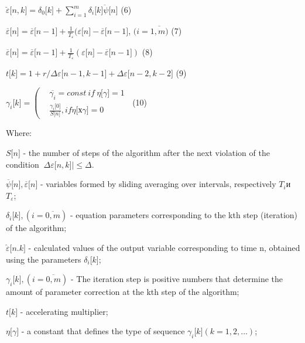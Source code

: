 \(\breve{\varepsilon}\lbrack n,k\rbrack = \delta_{0}\lbrack k\rbrack + \sum_{i = 1}^{m}{\delta_{i}\lbrack k\overline{\rbrack\psi}\lbrack n\rbrack}\)
(6)

\(\overline{\varepsilon}\lbrack n\rbrack = \overline{\varepsilon}\lbrack n - 1\rbrack + \frac{1}{T_{\varepsilon}}(\varepsilon\lbrack n\rbrack - \overline{\varepsilon}\lbrack n - 1\rbrack\),
\((i = \overline{1,m)}\) (7)

\(\overline{\varepsilon}\lbrack n\rbrack = \overline{\varepsilon}\lbrack n - 1\rbrack + \frac{1}{T_{\varepsilon}}(\varepsilon\lbrack n\rbrack - \overline{\varepsilon}\lbrack n - 1\rbrack)\)
(8)

\(t\lbrack k\rbrack = 1 + r/\Delta\varepsilon\lbrack n - 1,k - 1\rbrack + \Delta\varepsilon\lbrack n - 2,k - 2\rbrack\)
(9)

\(\gamma_{i}\lbrack k\rbrack = \left( \begin{aligned}
 & \overline{\gamma_{i}} = const\ if\ \eta\lbrack\gamma\rbrack = 1 \\
 & \frac{\gamma_{i}\lbrack 0\rbrack}{S\lbrack n\rbrack},if\eta\lbrack х\gamma\rbrack = 0
\end{aligned} \right.\ \) (10)

Where:

\(S\lbrack n\rbrack\) - the number of steps of the algorithm after the
next violation of the condition
\(\left. \ \Delta\varepsilon\lbrack n,k\rbrack \right| \leq \Delta\).

\(\overline{\psi}\lbrack n\rbrack,\overline{\varepsilon}\lbrack n\rbrack\)
- variables formed by sliding averaging over intervals, respectively
\(T_{i}\)и \(T_{\varepsilon}\);

\(\delta_{i}\lbrack k\rbrack,(i = \overline{0,m})\) - equation
parameters corresponding to the kth step (iteration) of the algorithm;

\(\overset{̑}{\varepsilon}\lbrack n.k\rbrack\) - calculated values of the
output variable corresponding to time n, obtained using the parameters
\(\delta_{i}\lbrack k\rbrack\);

\(\gamma_{i}\lbrack k\rbrack,(i = \overline{0,m})\) - The iteration step
is positive numbers that determine the amount of parameter correction at
the kth step of the algorithm;

\(t\lbrack k\rbrack\) - accelerating multiplier;

\(\eta\lbrack\gamma\rbrack\) - a constant that defines the type of
sequence \(\gamma_{i}\lbrack k\rbrack(k = 1,2,...)\);

